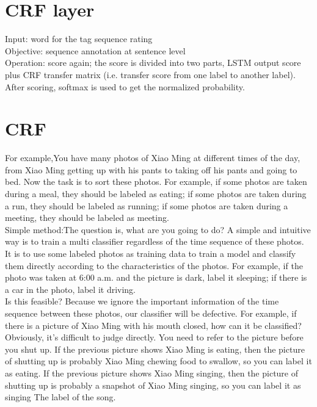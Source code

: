 \section{CRF layer} \label{sec-conclusions}
Input: word for the tag sequence rating\\
Objective: sequence annotation at sentence level\\
Operation: score again; the score is divided into two parts, LSTM output score plus CRF transfer matrix (i.e. transfer score from one label to another label). After scoring, softmax is used to get the normalized probability.
\section{CRF} \label{sec-conclusions}
For example,You have many photos of Xiao Ming at different times of the day, from Xiao Ming getting up with his pants to taking off his pants and going to bed. Now the task is to sort these photos. For example, if some photos are taken during a meal, they should be labeled as eating; if some photos are taken during a run, they should be labeled as running; if some photos are taken during a meeting, they should be labeled as meeting.\\
Simple method:The question is, what are you going to do? A simple and intuitive way is to train a multi classifier regardless of the time sequence of these photos. It is to use some labeled photos as training data to train a model and classify them directly according to the characteristics of the photos. For example, if the photo was taken at 6:00 a.m. and the picture is dark, label it sleeping; if there is a car in the photo, label it driving.\\
Is this feasible? Because we ignore the important information of the time sequence between these photos, our classifier will be defective. For example, if there is a picture of Xiao Ming with his mouth closed, how can it be classified? Obviously, it's difficult to judge directly. You need to refer to the picture before you shut up. If the previous picture shows Xiao Ming is eating, then the picture of shutting up is probably Xiao Ming chewing food to swallow, so you can label it as eating. If the previous picture shows Xiao Ming singing, then the picture of shutting up is probably a snapshot of Xiao Ming singing, so you can label it as singing The label of the song.\\

